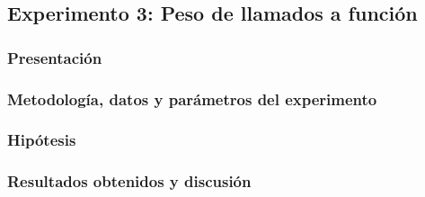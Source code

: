     \subsection{Experimento 3: Peso de llamados a función}

        \subsubsection*{Presentación}

        \subsubsection*{Metodología, datos y parámetros del experimento}

        \subsubsection*{Hipótesis}

        \subsubsection*{Resultados obtenidos y discusión}

